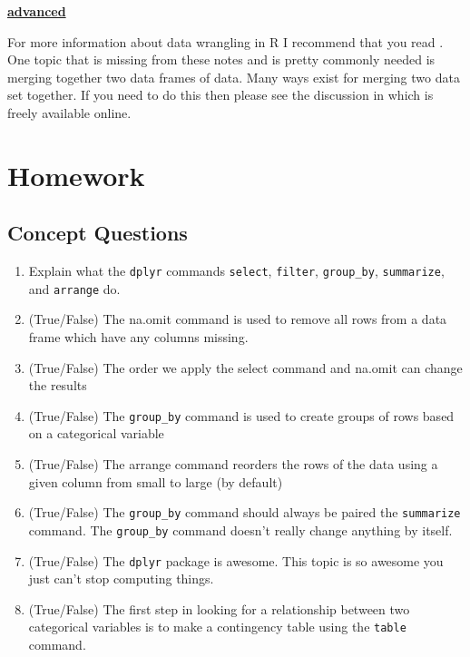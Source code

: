 \documentclass[
]{book}
\providecommand{\tightlist}{%
  \setlength{\itemsep}{0pt}\setlength{\parskip}{0pt}}
\newenvironment{rmdblock}[1]
  {\begin{shaded*}
  \centerline{\underline{\textbf{#1}}}

  }
  {
  \end{shaded*}
  }
\newenvironment{advanced}
  {\begin{rmdblock}{advanced}}
  {\end{rmdblock}}
\theoremstyle{definition}
\theoremstyle{definition}
\theoremstyle{definition}
\theoremstyle{definition}
\theoremstyle{remark}
\begin{document}
\begin{advanced}
For more information about data wrangling in R I recommend that you read \citep{Wickham2016}. One topic that is missing from these notes and is pretty commonly needed is merging together two data frames of data. Many ways exist for merging two data set together. If you need to do this then please see the discussion in \citep{Wickham2016} which is freely available online.\\
\end{advanced}

\hypertarget{homework-2}{%
\section{Homework}\label{homework-2}}

\hypertarget{concept-questions-2}{%
\subsection{Concept Questions}\label{concept-questions-2}}

\begin{enumerate}
\def\labelenumi{\arabic{enumi}.}
\tightlist
\item
  Explain what the \texttt{dplyr} commands \texttt{select}, \texttt{filter}, \texttt{group\_by}, \texttt{summarize}, and \texttt{arrange} do.
\item
  (True/False) The na.omit command is used to remove all rows from a data frame which have any columns missing.
\item
  (True/False) The order we apply the select command and na.omit can change the results
\item
  (True/False) The \texttt{group\_by} command is used to create groups of rows based on a categorical variable
\item
  (True/False) The arrange command reorders the rows of the data using a given column from small to large (by default)
\item
  (True/False) The \texttt{group\_by} command should always be paired the \texttt{summarize} command. The \texttt{group\_by} command doesn't really change anything by itself.
\item
  (True/False) The \texttt{dplyr} package is awesome. This topic is so awesome you just can't stop computing things.
\item
  (True/False) The first step in looking for a relationship between two categorical variables is to make a contingency table using the \texttt{table} command.
\end{enumerate}
\end{document}
